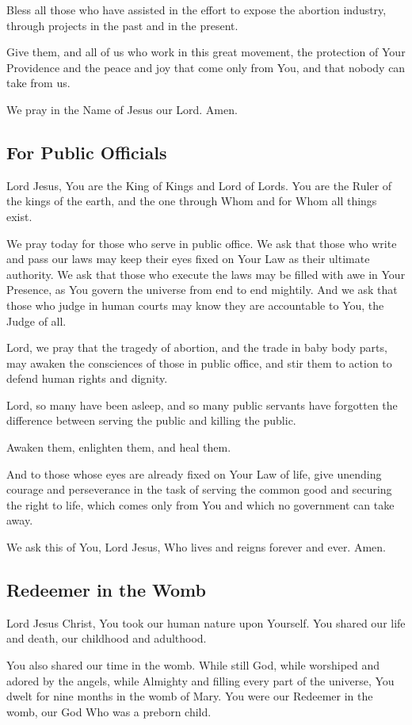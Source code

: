 \documentclass[12pt]{article}
\newcommand{\prayertitle}[1]{\subsection{#1}}
\begin{document}
Bless all those who have assisted in the effort to expose the abortion industry, through projects in the past and in the present.

Give them, and all of us who work in this great movement, the protection of Your Providence and the peace and joy that come only from You, and that nobody can take from us.

We pray in the Name of Jesus our Lord. Amen.

\prayertitle{For Public Officials}
Lord Jesus,
You are the King of Kings and Lord of Lords.
You are the Ruler of the kings of the earth, and the one through Whom and for Whom all things exist.

We pray today for those who serve in public office.
We ask that those who write and pass our laws may keep their eyes fixed on Your Law as their ultimate authority.
We ask that those who execute the laws may be filled with awe in Your Presence, as You govern the universe from end to end mightily.
And we ask that those who judge in human courts may know they are accountable to You, the Judge of all.

Lord, we pray that the tragedy of abortion, and the trade in baby body parts, may awaken the consciences of those in public office, and stir them to action to defend human rights and dignity.

Lord, so many have been asleep, and so many public servants have forgotten the difference between serving the public and killing the public.

Awaken them, enlighten them, and heal them.

And to those whose eyes are already fixed on Your Law of life, give unending courage and perseverance in the task of serving the common good and securing the right to life, which comes only from You and which no government can take away.

We ask this of You, Lord Jesus, Who lives and reigns forever and ever. Amen.

\prayertitle{Redeemer in the Womb}
Lord Jesus Christ, You took our human nature upon Yourself.
You shared our life and death, our childhood and adulthood.

You also shared our time in the womb. While still God, while worshiped and adored by the angels, while Almighty and filling every part of the universe, You dwelt for nine months in the womb of Mary.
You were our Redeemer in the womb, our God Who was a preborn child.
\end{document}
